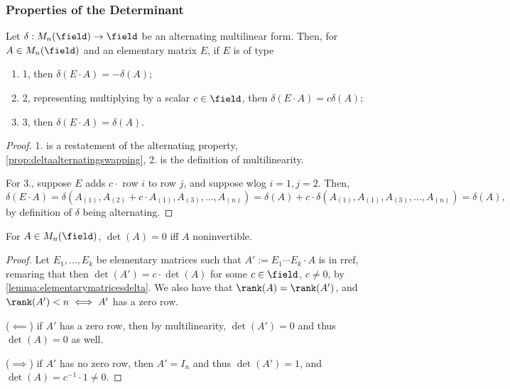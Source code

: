 \subsubsection{Properties of the Determinant}

\begin{lemma}\label{lemma:elementarymatricesdelta}
Let $\delta : M_n(\field) \to \field$ be an alternating multilinear form. Then, for $A \in M_n(\field)$ and an elementary matrix $E$, if $E$ is of type 
\begin{enumerate}
    \item 1, then $\delta(E \cdot A) = - \delta(A)$;
    \item 2, representing multiplying by a scalar $c \in \field$, then $\delta(E \cdot A) = c \delta(A)$;
    \item 3, then $\delta(E \cdot A) = \delta(A)$.
\end{enumerate}
\end{lemma}

\begin{proof}
    1. is a restatement of the alternating property, \cref{prop:deltaalternatingswapping}, 2. is the definition of multilinearity.

    For 3., suppose $E$ adds $c \cdot $ row $i$ to row $j$, and suppose wlog $i = 1, j = 2$. Then, \[
    \delta(E \cdot A) = \delta(A_{(1)}, A_{(2)} + c \cdot A_{(1)}, A_{(3)}, \dots, A_{(n)})  = \delta(A) + c \cdot \delta(A_{(1)}, A_{(1)}, A_{(3)}, \dots, A_{(n)}) = \delta(A),
    \]
    by definition of $\delta$ being alternating.
\end{proof}

\begin{theorem}\label{thm:determinantinvertibility}
For $A \in M_n(\field)$, $\det(A) = 0$ iff $A$ noninvertible.
\end{theorem}

\begin{proof}
    Let $E_1, \dots, E_k$ be elementary matrices such that $A' := E_1 \cdots E_k \cdot A$ is in rref, remaring that then $\det(A') = c \cdot \det(A)$ for some $c \in \field$, $c \neq 0$, by \cref{lemma:elementarymatricesdelta}. We also have that $\rank(A) = \rank(A')$, and $\rank(A') < n \iff A'$ has a zero row. 

    ($\impliedby$) if $A'$ has a zero row, then by multilinearity, $\det(A') = 0$ and thus $\det(A) = 0$ as well.

    ($\implies$) if $A'$ has no zero row, then $A' = I_n$ and thus $\det(A') = 1$, and $\det(A) = c^{-1} \cdot 1 \neq 0$.
\end{proof}

